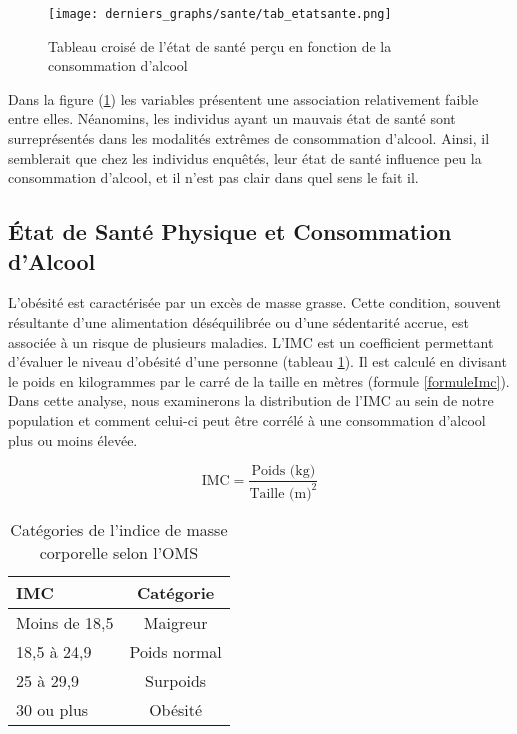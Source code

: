 \documentclass{article}
\begin{document}
\begin{figure}[H]
  \centering
  \texttt{[image: derniers\_graphs/sante/tab\_etatsante.png]} 
  \caption{Tableau croisé de l'état de santé perçu en fonction de la consommation d'alcool}

  \label{fig:santefig5}
\end{figure}

 Dans la figure (\ref{fig:santefig5}) les variables présentent une association relativement faible entre elles. Néanomins, les individus ayant un mauvais état de santé sont surreprésentés dans les modalités extrêmes de consommation d'alcool. Ainsi, il semblerait que chez les individus enquêtés, leur état de santé influence peu la consommation d’alcool, et il n'est pas clair dans quel sens le fait il. 


\subsection{État de Santé Physique et Consommation d'Alcool}
L'obésité est caractérisée par un excès de masse grasse. Cette condition, souvent résultante d'une alimentation déséquilibrée ou d'une sédentarité accrue, est associée à un risque de plusieurs maladies. L'IMC est un coefficient permettant d'évaluer le niveau d'obésité d'une personne (tableau \ref{imcong}). Il est calculé en divisant le poids en kilogrammes par le carré de la taille en mètres (formule \ref{formuleImc}). Dans cette analyse, nous examinerons la distribution de l'IMC au sein de notre population et comment celui-ci peut être corrélé à une consommation d'alcool plus ou moins élevée.

\begin{equation}
    \text{IMC} = \frac{\text{Poids (kg)}}{\text{Taille (m)}^2}
    \label{formuleImc}
\end{equation}

\begin{table}[H]
    \centering
    \begin{tabular}{lc}
        \toprule
        \textbf{IMC} & \textbf{Catégorie} \\
        \midrule
        Moins de 18,5 & Maigreur \\
        18,5 à 24,9 & Poids normal \\
        25 à 29,9 & Surpoids \\
        30 ou plus & Obésité \\
        \bottomrule
    \end{tabular}
    \caption{Catégories de l'indice de masse corporelle selon l'OMS}
    \label{imcong}

\end{table}
\end{document}
